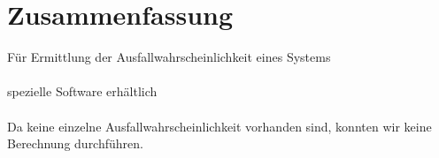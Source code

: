\documentclass{beamer}
\begin{document}
\section{Zusammenfassung}
\frame{\tableofcontents[currentsection]}
\begin{frame}
	Für Ermittlung der Ausfallwahrscheinlichkeit eines Systems\\~\\
	spezielle Software erhältlich\\~\\
	Da keine einzelne Ausfallwahrscheinlichkeit vorhanden sind, konnten wir keine Berechnung durchführen.
	
	
	
	
\end{frame}
\end{document}
